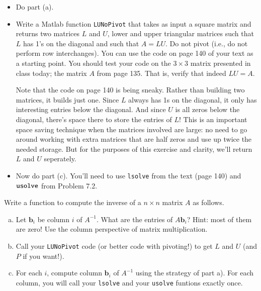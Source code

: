 \documentclass[12pt]{article}
\makeatletter
\theoremstyle{homework}
\newenvironment{exercise}[1]
{\def\@currentlabel{#1}\exercisecore}
{\endexercisecore}
\makeatother
\begin{document}
\begin{exercise} {Problem 7.3 [Modified]} \strut

\begin{itemize}
	\item Do part (a).
	\item Write a Matlab function {\tt LUNoPivot} that 
	takes as input a square matrix and returns two matrices $L$ and $U$,
	lower and upper triangular matrices such that $L$ has 1's
	on the diagonal and such that $A=LU$.  Do not pivot (i.e., do not perform row interchanges).  You can use the code on page 140
	of your text as a starting point. You should test your code on the 
	$3\times 3$ matrix presented in class today; the matrix $A$ from
	page 135.  That is, verify that indeed $LU=A$.

	Note that the code on page 140 is being sneaky.  Rather than building two matrices, it builds just one. Since $L$ always has 1s on the diagonal, it only has interesting entries below the diagonal.  And since $U$ is all zeros below the diagonal, there's space there to store the entries of $L$!  This is an important space saving technique when the matrices involved are large: no need to go around working with extra matrices that are half zeros and use up twice the needed storage.  But for the purposes of this exercise and clarity,
	we'll return $L$ and $U$ seperately.
	\item Now do part (c). You'll need to use {\tt lsolve} from the
	text (page 140) and ${\tt usolve}$ from Problem 7.2.
\end{itemize}
\end{exercise}

\begin{exercise}{Supplemental 1}
Write a function to compute the inverse of a $n\times n$ matrix $A$ as follows.
\begin{enumerate}[(a)]
	\item Let $\mathbf{b}_i$ be column $i$ of $A^{-1}$.  What
	are the entries of  $A \mathbf{b}_i$?  Hint: most of them are zero!
	Use the column perspective of matrix multiplication.
	\item Call your {\tt LUNoPivot} code (or better code with pivoting!)
	to get $L$ and $U$ (and $P$ if you want!).
	\item For each $i$, compute column $\mathbf{b}_i$ of $A^{-1}$
	using the strategy of part a).  For each column, you will call your {\tt lsolve} and your {\tt usolve} funtions exactly once.
\end{enumerate}
\end{exercise}
\end{document}
